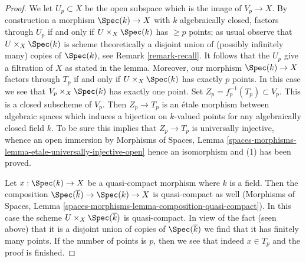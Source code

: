\begin{proof}
\medskip\noindent
We let $U_p \subset X$ be the open subspace which is the
image of $V_p \to X$. By construction a morphism $\Spec(k) \to X$ with
$k$ algebraically closed, factors through $U_p$ if and only if
$U \times_X \Spec(k)$ has $\geq p$ points; as usual observe that
$U \times_X \Spec(k)$ is scheme theoretically a disjoint union of
(possibly infinitely many) copies of $\Spec(k)$, see
Remark \ref{remark-recall}. It follows that
the $U_p$ give a filtration of $X$ as stated in the lemma.
Moreover, our morphism $\Spec(k) \to X$ factors through $T_p$
if and only if $U \times_X \Spec(k)$ has exactly $p$ points.
In this case we see that $V_p \times_X \Spec(k)$ has exactly one point.
Set $Z_p = f_p^{-1}(T_p) \subset V_p$. This is a closed subscheme of $V_p$.
Then $Z_p \to T_p$ is an \'etale morphism between
algebraic spaces which induces a bijection on $k$-valued
points for any algebraically closed field $k$. To be sure this
implies that $Z_p \to T_p$ is universally injective, whence an
open immersion by
Morphisms of Spaces, Lemma
\ref{spaces-morphisms-lemma-etale-universally-injective-open}
hence an isomorphism and (1) has been proved.

\medskip\noindent
Let $x : \Spec(k) \to X$ be a quasi-compact morphism where $k$ is a field.
Then the composition $\Spec(\overline{k}) \to \Spec(k) \to X$ is quasi-compact
as well (Morphisms of Spaces, Lemma
\ref{spaces-morphisms-lemma-composition-quasi-compact}).
In this case the scheme $U \times_X \Spec(\overline{k})$ is
quasi-compact. In view of the fact (seen above) that it is a disjoint union
of copies of $\Spec(\overline{k})$ we find that it has finitely many points.
If the number of points is $p$, then we see that indeed $x \in T_p$ and
the proof is finished.
\end{proof}
